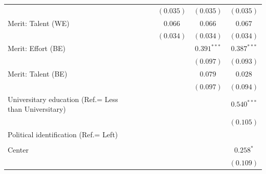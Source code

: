 \documentclass[
  12pt,
]{article}
\begin{document}
\begin{table}
\begin{center}
{\begin{tabular}{l c c c c c c c}
                                                      &                &                &                &                & $(0.035)$      & $(0.035)$     & $(0.035)$      \\
Merit: Talent (WE)                                    &                &                &                &                & $0.066$        & $0.066$       & $0.067$        \\
                                                      &                &                &                &                & $(0.034)$      & $(0.034)$     & $(0.034)$      \\
Merit: Effort (BE)                                    &                &                &                &                &                & $0.391^{***}$ & $0.387^{***}$  \\
                                                      &                &                &                &                &                & $(0.097)$     & $(0.093)$      \\
Merit: Talent (BE)                                    &                &                &                &                &                & $0.079$       & $0.028$        \\
                                                      &                &                &                &                &                & $(0.097)$     & $(0.094)$      \\
Universitary education (Ref.= Less than Universitary) &                &                &                &                &                &               & $0.540^{***}$  \\
                                                      &                &                &                &                &                &               & $(0.105)$      \\
Political identification (Ref.= Left)                 &                &                &                &                &                &               &                \\
                                                      &                &                &                &                &                &               &                \\
\quad Center                                          &                &                &                &                &                &               & $0.258^{*}$    \\
                                                      &                &                &                &                &                &               & $(0.109)$      \\

\end{tabular}}
\end{center}
\end{table}
\end{document}
